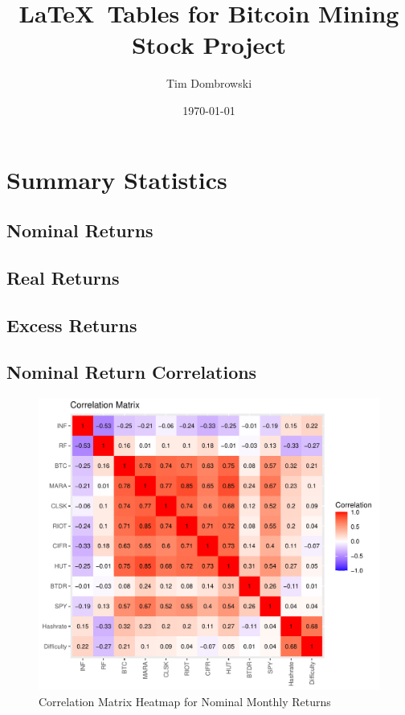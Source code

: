 \documentclass[]{article}
\title{\LaTeX~Tables for Bitcoin Mining Stock Project}
\author{Tim Dombrowski}
\date{\today}
\begin{document}
\maketitle

\large

\section{Summary Statistics}

\subsection{Nominal Returns}



\pagebreak

\subsection{Real Returns}




\subsection{Excess Returns}



\pagebreak

\subsection{Nominal Return Correlations}

\begin{figure}[htbp]
	\label{finalcorplot}
	\caption{Correlation Matrix Heatmap for Nominal Monthly Returns}
	\includegraphics[width=\linewidth]{finalcorplot.pdf}
\end{figure}
\end{document}
